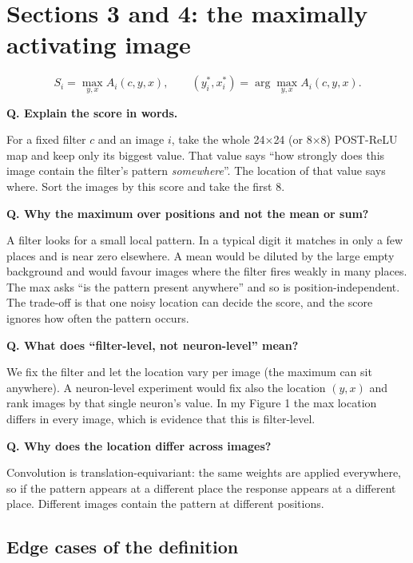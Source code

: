 \documentclass[11pt]{article}
\newcommand{\Q}[1]{\par\vspace{4pt}\noindent\textcolor{qcol}{\textbf{Q. #1}}\par\nopagebreak}
\newcommand{\A}[1]{\noindent #1\par}
\begin{document}
\section{Sections 3 and 4: the maximally activating image}

\[
S_i=\max_{y,x}A_i(c,y,x),\qquad (y_i^*,x_i^*)=\arg\max_{y,x}A_i(c,y,x).
\]

\Q{Explain the score in words.}
\A{For a fixed filter $c$ and an image $i$, take the whole 24$\times$24 (or 8$\times$8) POST-ReLU map and keep only its biggest value. That value says ``how strongly does this image contain the filter's pattern \emph{somewhere}''. The location of that value says where. Sort the images by this score and take the first 8.}

\Q{Why the maximum over positions and not the mean or sum?}
\A{A filter looks for a small local pattern. In a typical digit it matches in only a few places and is near zero elsewhere. A mean would be diluted by the large empty background and would favour images where the filter fires weakly in many places. The max asks ``is the pattern present anywhere'' and so is position-independent. The trade-off is that one noisy location can decide the score, and the score ignores how often the pattern occurs.}

\Q{What does ``filter-level, not neuron-level'' mean?}
\A{We fix the filter and let the location vary per image (the maximum can sit anywhere). A neuron-level experiment would fix also the location $(y,x)$ and rank images by that single neuron's value. In my Figure 1 the max location differs in every image, which is evidence that this is filter-level.}

\Q{Why does the location differ across images?}
\A{Convolution is translation-equivariant: the same weights are applied everywhere, so if the pattern appears at a different place the response appears at a different place. Different images contain the pattern at different positions.}

\subsection*{Edge cases of the definition}
\end{document}
